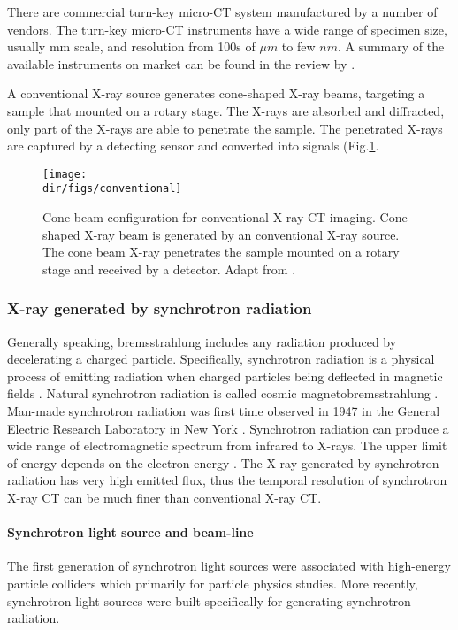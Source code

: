 There are commercial turn-key micro-CT system manufactured by a number of vendors. The turn-key micro-CT instruments have a wide range of specimen size, usually mm scale, and resolution from 100s of $\mu m$ to few $nm$. A summary of the available instruments on market can be found in the review by \citep{stock2008recent}. 

A conventional X-ray source generates cone-shaped X-ray beams, targeting a sample that mounted on a rotary stage. The X-rays are absorbed and diffracted, only part of the X-rays are able to penetrate the sample. The penetrated X-rays are captured by a detecting sensor and converted into signals (Fig.\ref{conventional}.

\begin{figure}[htbp]
  \centering
  \texttt{[image: \\dir/figs/conventional]}
  \caption{Cone beam configuration for conventional X-ray CT imaging. Cone-shaped X-ray beam is generated by an conventional X-ray source. The cone beam X-ray penetrates the sample mounted on a rotary stage and received by a detector. Adapt from \citet{wildenschild2013x}.}
  \label{conventional}
\end{figure}

\subsubsection{X-ray generated by synchrotron radiation}
Generally speaking, bremsstrahlung includes any radiation produced by decelerating a charged particle. Specifically, synchrotron radiation is a physical process of emitting radiation when charged particles being deflected in magnetic fields \citep{sokolov1966synchrotron}. Natural synchrotron radiation is called cosmic magnetobremsstrahlung \citep{ginzburg1965cosmic}. Man-made synchrotron radiation was first time observed in 1947 in the General Electric Research Laboratory in New York \citep{robinson2001history}. Synchrotron radiation can produce a wide range of  electromagnetic spectrum from infrared to X-rays. The upper limit of energy depends on the electron energy \citep{bonse1996x}. The X-ray generated by synchrotron radiation has very high emitted flux, thus the temporal resolution of synchrotron X-ray CT can be much finer than conventional X-ray CT.

\paragraph{Synchrotron light source and beam-line}
The first generation of synchrotron light sources were associated with high-energy particle colliders which primarily for particle physics studies. More recently, synchrotron light sources were built specifically for generating synchrotron radiation. 

